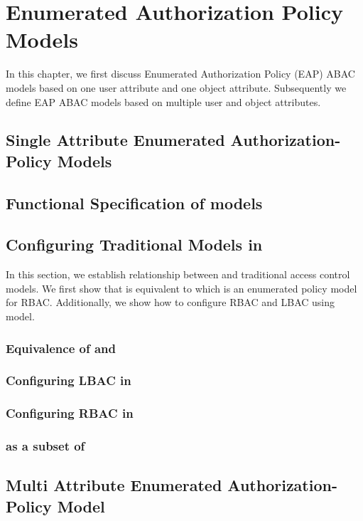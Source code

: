 \chapter{Enumerated Authorization Policy Models}
\label{sec:concepts}
In this chapter, we first discuss Enumerated Authorization Policy (EAP) ABAC models based on one user attribute and one object attribute. Subsequently we define EAP ABAC models based on multiple user and object attributes. 




	

\section{Single Attribute Enumerated Authorization-Policy Models}

	
\section{Functional Specification of \eapABAC{} models}
	
\section{Configuring Traditional Models in  \eapABAC{}}
	\label{sec:configuration}
	In this section, we establish relationship between \eapABAC{} and traditional access control models. We first show that \eapABAC{} is equivalent to \twoSortedRBAC{} which is an enumerated policy model for RBAC. Additionally, we show how to configure RBAC and LBAC using \eapABAC{} model.
\subsection{Equivalence of \eapABAC{}  and \twoSortedRBAC{} }
	
\subsection{Configuring LBAC in \eapABAC{}}
	
\subsection{Configuring RBAC in \eapABAC{}}
	
\subsection{\eapABAC{} as a subset of \policyMachine{}}
	
\section{Multi Attribute Enumerated Authorization-Policy Model }
	